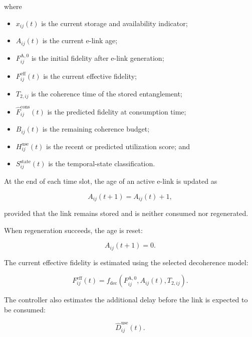 where

\begin{itemize}
    \item $x_{ij}(t)$ is the current storage and availability indicator;
    \item $A_{ij}(t)$ is the current e-link age;
    \item $F_{ij}^{\mathrm{A},0}$ is the initial fidelity after e-link generation;
    \item $F_{ij}^{\mathrm{eff}}(t)$ is the current effective fidelity;
    \item $T_{2,ij}$ is the coherence time of the stored entanglement;
    \item $\widehat{F}_{ij}^{\mathrm{cons}}(t)$ is the predicted fidelity at consumption time;
    \item $B_{ij}(t)$ is the remaining coherence budget;
    \item $H_{ij}^{\mathrm{use}}(t)$ is the recent or predicted utilization score; and
    \item $S_{ij}^{\mathrm{state}}(t)$ is the temporal-state classification.
\end{itemize}

At the end of each time slot, the age of an active e-link is updated as

\begin{equation}
    A_{ij}(t+1)
    =
    A_{ij}(t)
    +
    1,
\end{equation}

provided that the link remains stored and is neither consumed nor regenerated.

When regeneration succeeds, the age is reset:

\begin{equation}
    A_{ij}(t+1)
    =
    0.
\end{equation}

The current effective fidelity is estimated using the selected decoherence model:

\begin{equation}
    F_{ij}^{\mathrm{eff}}(t)
    =
    f_{\mathrm{dec}}
    \left(
    F_{ij}^{\mathrm{A},0},
    A_{ij}(t),
    T_{2,ij}
    \right).
\end{equation}

The controller also estimates the additional delay before the link is expected to be consumed:

\begin{equation}
    \widehat{D}_{ij}^{\mathrm{use}}(t).
\end{equation}

